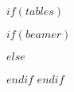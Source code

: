 $if(tables)$
\usepackage{longtable,booktabs,array}
\usepackage{multirow}
\usepackage{calc} %
$if(beamer)$
\usepackage{caption}
\makeatletter
\def\fnum@table{\tablename~\thetable}
\makeatother
$else$
\usepackage{etoolbox}
\makeatletter
\patchcmd\longtable{\par}{\if@noskipsec\mbox{}\fi\par}{}{}
\makeatother
$endif$
\let\oldlongtable\longtable
\let\endoldlongtable\endlongtable
\renewenvironment{longtable}{
\footnotesize
\oldlongtable} {
\endoldlongtable
\normalsize}
$endif$
